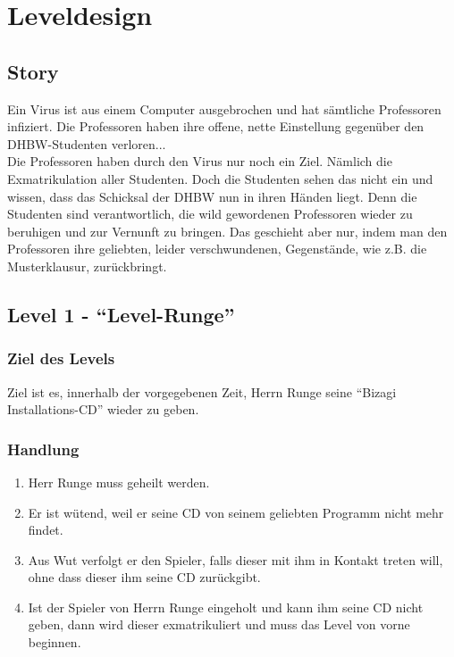 
\chapter{Leveldesign}

\section{Story}
Ein Virus ist aus einem Computer ausgebrochen und hat sämtliche Professoren infiziert. Die Professoren haben ihre offene, nette Einstellung gegenüber den DHBW-Studenten verloren...\\
Die Professoren haben durch den Virus nur noch ein Ziel. Nämlich die Exmatrikulation aller Studenten. Doch die Studenten sehen das nicht ein und wissen, dass das Schicksal der DHBW nun in ihren Händen liegt. Denn die Studenten sind verantwortlich, die wild gewordenen Professoren wieder zu beruhigen und zur Vernunft zu bringen. Das geschieht aber nur, indem man den Professoren ihre geliebten, leider verschwundenen, Gegenstände, wie z.B. die Musterklausur, zurückbringt.  

\section{Level 1 - \enquote{Level-Runge}}
\subsection{Ziel des Levels}
Ziel ist es, innerhalb der vorgegebenen Zeit, Herrn Runge seine \enquote{Bizagi Installations-CD} wieder zu geben.
\subsection{Handlung}
\begin{enumerate}
\item Herr Runge muss geheilt werden.
\item Er ist wütend, weil er seine CD von seinem geliebten Programm nicht mehr findet. 
\item Aus Wut verfolgt er den Spieler, falls dieser mit ihm in Kontakt treten will, ohne dass dieser ihm seine CD zurückgibt.
\item Ist der Spieler von Herrn Runge eingeholt und kann ihm seine CD nicht geben, dann wird dieser exmatrikuliert und muss das Level von vorne beginnen.
\end{enumerate}
